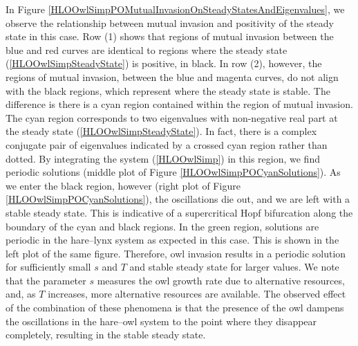 \documentclass[12pt]{UOthesis}
\theoremstyle{remarkstyle}
\begin{document}
In Figure \ref{HLOOwlSimpPOMutualInvasionOnSteadyStatesAndEigenvalues}, we observe the relationship between mutual invasion and positivity of the steady state in this case. Row (1) shows that regions of mutual invasion between the blue and red curves are identical to regions where the steady state (\ref{HLOOwlSimpSteadyState}) is positive, in black. In row (2), however, the regions of mutual invasion, between the blue and magenta curves, do not align with the black regions, which represent where the steady state is stable. The difference is there is a cyan region contained within the region of mutual invasion. The cyan region corresponds to two eigenvalues with non-negative real part at the steady state (\ref{HLOOwlSimpSteadyState}). In fact, there is a complex conjugate pair of eigenvalues indicated by a crossed cyan region rather than dotted. By integrating the system (\ref{HLOOwlSimp}) in this region, we find periodic solutions (middle plot of Figure \ref{HLOOwlSimpPOCyanSolutions}). As we enter the black region, however (right plot of Figure \ref{HLOOwlSimpPOCyanSolutions}), the oscillations die out, and we are left with a stable steady state. This is indicative of a supercritical Hopf bifurcation along the boundary of the cyan and black regions. In the green region, solutions are periodic in the hare--lynx system as expected in this case. This is shown in the left plot of the same figure. Therefore, owl invasion results in a periodic solution for sufficiently small $s$ and $T$ and stable steady state for larger values. We note that the parameter $s$ measures the owl growth rate due to alternative resources, and, as $T$ increases, more alternative resources are available. The observed effect of the combination of these phenomena is that the presence of the owl dampens the oscillations in the hare--owl system to the point where they disappear completely, resulting in the stable steady state.\\
\end{document}
